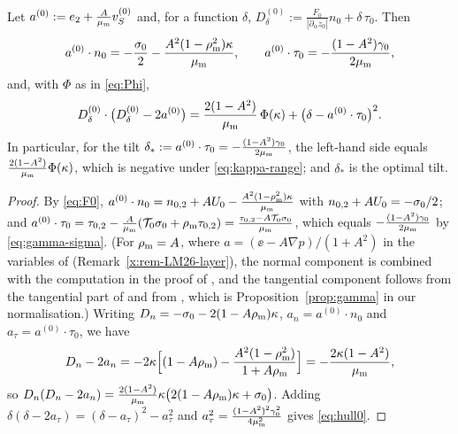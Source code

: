 \begin{lemma}\label{lem:hull0}
Let $a^{(0)}:=e_2+\frac A{\mu_{\mathrm m}} v_S^{(0)}$ and, for a function $\delta$, $D^{(0)}_\delta:=\frac{F_0}{|\partial_\alpha z_0|}n_0+\delta\,\tau_0$. Then
\begin{equation}\label{eq:a0}
a^{(0)}\cdot n_0=-\frac{\sigma_0}2-\frac{A^2(1-\rho_{\mathrm m}^2)\kappa}{\mu_{\mathrm m}},\qquad a^{(0)}\cdot\tau_0=-\frac{(1-A^2)\gamma_0}{2\mu_{\mathrm m}},
\end{equation}
and, with $\Phi$ as in \eqref{eq:Phi},
\begin{equation}\label{eq:hull0}
D^{(0)}_\delta\cdot\big(D^{(0)}_\delta-2a^{(0)}\big)=\frac{2(1-A^2)}{\mu_{\mathrm m}}\,\Phi(\kappa)+\big(\delta-a^{(0)}\cdot\tau_0\big)^2 .
\end{equation}
In particular, for the tilt $\delta_*:=a^{(0)}\cdot\tau_0=-\frac{(1-A^2)\gamma_0}{2\mu_{\mathrm m}}$, the left-hand side equals $\frac{2(1-A^2)}{\mu_{\mathrm m}}\Phi(\kappa)$, which is negative under \eqref{eq:kappa-range}; and
$\delta_*$ is the optimal tilt.
\end{lemma}

\begin{proof}
By \eqref{eq:F0}, $a^{(0)}\cdot n_0=n_{0,2}+AU_0-\frac{A^2(1-\rho_{\mathrm m}^2)\kappa}{\mu_{\mathrm m}}$ with $n_{0,2}+AU_0=-\sigma_0/2$; and
$a^{(0)}\cdot\tau_0=\tau_{0,2}-\frac{A}{\mu_{\mathrm m}}(\mathcal{T}_0\sigma_0+\rho_{\mathrm m}\tau_{0,2})=\frac{\tau_{0,2}-A\mathcal{T}_0\sigma_0}{\mu_{\mathrm m}}$, which equals $-\frac{(1-A^2)\gamma_0}{2\mu_{\mathrm m}}$ by \eqref{eq:gamma-sigma}.
(For $\rho_{\mathrm m}=A$, where $a=(\ee-A\nabla p)/(1+A^2)$ in the variables of \cite{LM26} (Remark~\ref{x:rem-LM26-layer}), the normal component is \cite[(7.11)]{LM26} combined with the computation
in the proof of \cite[Prop.~7.4]{LM26}, and the tangential component follows from the tangential part of \cite[(7.11)]{LM26} and from \cite[(3.7b)]{LM26}, which is
Proposition~\ref{prop:gamma} in our normalisation.) Writing
$D_n=-\sigma_0-2(1-A\rho_{\mathrm m})\kappa$, $a_n=a^{(0)}\cdot n_0$ and $a_\tau=a^{(0)}\cdot\tau_0$, we have
\[
D_n-2a_n=-2\kappa\Big[(1-A\rho_{\mathrm m})-\frac{A^2(1-\rho_{\mathrm m}^2)}{1+A\rho_{\mathrm m}}\Big]=-\frac{2\kappa(1-A^2)}{\mu_{\mathrm m}},
\]
so $D_n(D_n-2a_n)=\frac{2(1-A^2)}{\mu_{\mathrm m}}\kappa\big(2(1-A\rho_{\mathrm m})\kappa+\sigma_0\big)$. Adding $\delta(\delta-2a_\tau)=(\delta-a_\tau)^2-a_\tau^2$ and $a_\tau^2=\frac{(1-A^2)^2\gamma_0^2}{4\mu_{\mathrm m}^2}$ gives \eqref{eq:hull0}.
\end{proof}

